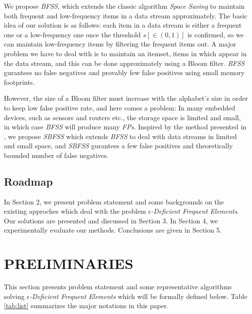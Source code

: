 \documentclass[conference]{IEEEtran}
\begin{document}
We propose \emph{BFSS}, which extends the classic algorithm \emph{Space Saving} to maintain both frequent and low-frequency items in a data stream approximately. The basic idea of our solution is as follows: each item in a data stream is either a frequent one or a low-frequency one once the threshold $s[\in (0,1)]$ is confirmed, so we can maintain low-frequency items by filtering the frequent items out. A major problem we have to deal with is to maintain an itemset, items in which appear in the data stream, and this can be done approximately using a Bloom filter. \emph{BFSS} gurantees no false negatives and provably few false positives using small memory footprints.\par

However, the size of a Bloom filter must increase with the alphabet's size in order to keep low false positive rate, and here comes a problem: In many embedded devices, such as sensors and routers etc., the storage space is limited and small, in which case \emph{BFSS} will produce many \emph{FPs}. Inspired by the method presented in \cite{IEEEexample:sbf}, we propose \emph{SBFSS} which extends \emph{BFSS} to deal with data streams in limited and small space, and \emph{SBFSS} gurantees a few false positives and theoretically bounded number of false negatives.\par

\subsection{Roadmap}
In Section 2, we present problem statement and some backgrounds on the existing approches which deal with the problem $\epsilon$\emph{-Deficient Frequent Elements}. Our solutions are presented and discussed in Section 3. In Section 4, we experimentally evaluate our methods. Conclusions are given in Section 5.

\section{PRELIMINARIES}
This section presents problem statement and some representative algorithms solving $\epsilon$\emph{-Deficient Frequent Elements} \cite{IEEEexample:sticky} which will be formally defined below. Table \ref{tab:list} summarizes the major notations in this paper.
\end{document}
